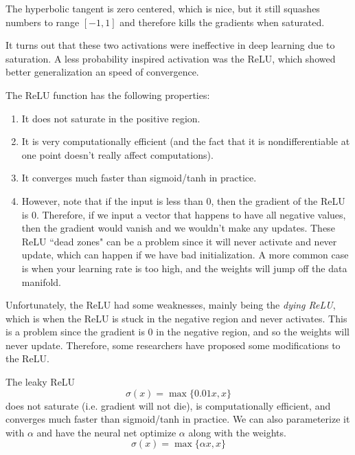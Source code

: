 \documentclass{article}
\begin{document}
    \begin{definition}
      The hyperbolic tangent is zero centered, which is nice, but it still squashes numbers to range $[-1, 1]$ and therefore kills the gradients when saturated. 
    \end{definition}

    It turns out that these two activations were ineffective in deep learning due to saturation. A less probability inspired activation was the ReLU, which showed better generalization an speed of convergence. 

    \begin{definition}
      The ReLU function has the following properties: 
      \begin{enumerate}
          \item It does not saturate in the positive region. 
          \item It is very computationally efficient (and the fact that it is nondifferentiable at one point doesn't really affect computations). 
          \item It converges much faster than sigmoid/tanh in practice. 
          \item However, note that if the input is less than $0$, then the gradient of the ReLU is $0$. Therefore, if we input a vector that happens to have all negative values, then the gradient would vanish and we wouldn't make any updates. These ReLU ``dead zones" can be a problem since it will never activate and never update, which can happen if we have bad initialization. A more common case is when your learning rate is too high, and the weights will jump off the data manifold. 
      \end{enumerate}
    \end{definition}

    Unfortunately, the ReLU had some weaknesses, mainly being the \textit{dying ReLU}, which is when the ReLU is stuck in the negative region and never activates. This is a problem since the gradient is $0$ in the negative region, and so the weights will never update. Therefore, some researchers have proposed some modifications to the ReLU. 

    \begin{definition}
      The leaky ReLU 
      \begin{equation}
        \sigma(x) = \max\{0.01 x, x\}
      \end{equation}
      does not saturate (i.e. gradient will not die), is computationally efficient, and converges much faster than sigmoid/tanh in practice. We can also parameterize it with $\alpha$ and have the neural net optimize $\alpha$ along with the weights. 
      \begin{equation}
        \sigma(x) = \max\{\alpha x, x\}
      \end{equation}
    \end{definition}
\end{document}
